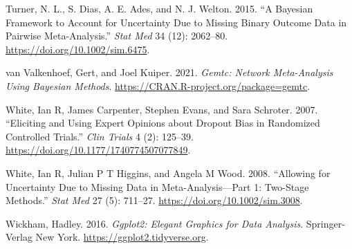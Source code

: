 \begin{CSLReferences}{1}{0}
\leavevmode{}%
Turner, N. L., S. Dias, A. E. Ades, and N. J. Welton. 2015. {``A Bayesian Framework to Account for Uncertainty Due to Missing Binary Outcome Data in Pairwise Meta-Analysis.''} \emph{Stat Med} 34 (12): 2062--80. \url{https://doi.org/10.1002/sim.6475}.

\leavevmode{}%
van Valkenhoef, Gert, and Joel Kuiper. 2021. \emph{Gemtc: Network Meta-Analysis Using Bayesian Methods}. \url{https://CRAN.R-project.org/package=gemtc}.

\leavevmode{}%
White, Ian R, James Carpenter, Stephen Evans, and Sara Schroter. 2007. {``Eliciting and Using Expert Opinions about Dropout Bias in Randomized Controlled Trials.''} \emph{Clin Trials} 4 (2): 125--39. \url{https://doi.org/10.1177/1740774507077849}.

\leavevmode{}%
White, Ian R, Julian P T Higgins, and Angela M Wood. 2008. {``Allowing for Uncertainty Due to Missing Data in Meta-Analysis---Part 1: Two-Stage Methods.''} \emph{Stat Med} 27 (5): 711--27. \url{https://doi.org/10.1002/sim.3008}.

\leavevmode{}%
Wickham, Hadley. 2016. \emph{Ggplot2: Elegant Graphics for Data Analysis}. Springer-Verlag New York. \url{https://ggplot2.tidyverse.org}.

\end{CSLReferences}



\address{%
Loukia M. Spineli\\
Midwifery Research and Education Unit\\%
Hannover Medical School\\ Carl-Neuber-Strasse 1, 30625, Hannover, Germany\\
%
\url{https://www.github.com/LoukiaSpin}\\%
\textit{ORCiD: \href{https://orcid.org/0000-0001-9515-582X}{0000-0001-9515-582X}}\\%
\href{mailto:Spineli.Loukia@mh-hannover.de}{\nolinkurl{Spineli.Loukia@mh-hannover.de}}%
}

\address{%
Chrysostomos Kalyvas\\
Biostatistics and Research Decision Sciences\\%
MSD Europe Inc., Brussels, Belgium\\
%
\url{https://www.github.com/ckalyvas}\\%
\textit{ORCiD: \href{https://orcid.org/0000-0003-0606-4518}{0000-0003-0606-4518}}\\%
\href{mailto:chrysostomos.kalyvas@merck.com}{\nolinkurl{chrysostomos.kalyvas@merck.com}}%
}

